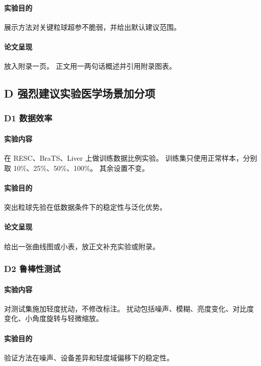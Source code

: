 \documentclass[UTF8,a4paper]{ctexart}
\begin{document}
\paragraph{实验目的}
展示方法对关键粒球超参不脆弱，并给出默认建议范围。

\paragraph{论文呈现}
放入附录一页。
正文用一两句话概述并引用附录图表。

\subsection{D 强烈建议实验\quad 医学场景加分项}

\subsubsection{D1 数据效率}

\paragraph{实验内容}
在 RESC、BraTS、Liver 上做训练数据比例实验。
训练集只使用正常样本，分别取 10\%、25\%、50\%、100\%。
其余设置不变。

\paragraph{实验目的}
突出粒球先验在低数据条件下的稳定性与泛化优势。

\paragraph{论文呈现}
给出一张曲线图或小表，放正文补充实验或附录。

\subsubsection{D2 鲁棒性测试}

\paragraph{实验内容}
对测试集施加轻度扰动，不修改标注。
扰动包括噪声、模糊、亮度变化、对比度变化、小角度旋转与轻微缩放。

\paragraph{实验目的}
验证方法在噪声、设备差异和轻度域偏移下的稳定性。
\end{document}
